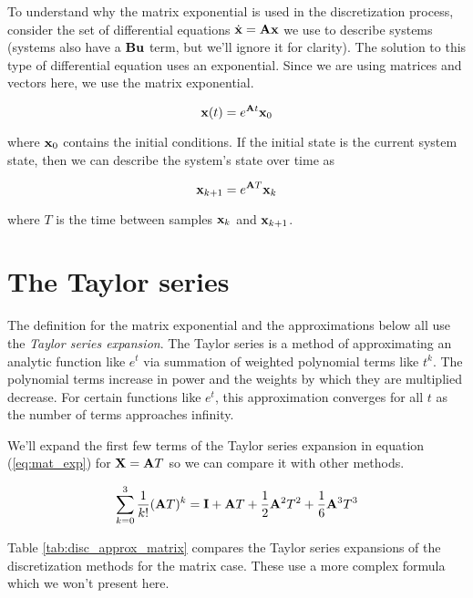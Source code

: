 To understand why the matrix exponential is used in the discretization process,
consider the set of differential equations $\dot{\mathbf{x}} = \mathbf{A}\mathbf{x}$ we
use to describe systems (systems also have a $\mathbf{B}\mathbf{u}$ term, but we'll
ignore it for clarity). The solution to this type of differential equation uses
an exponential. Since we are using matrices and vectors here, we use the matrix
exponential.

\begin{equation*}
  \mathbf{x}(t) = e^{\mathbf{A}t} \mathbf{x}_0
\end{equation*}

where $\mathbf{x}_0$ contains the initial conditions. If the initial state is the
current system state, then we can describe the system's state over time as

\begin{equation*}
  \mathbf{x}_{k+1} = e^{\mathbf{A}T} \mathbf{x}_k
\end{equation*}

where $T$ is the time between samples $\mathbf{x}_k$ and $\mathbf{x}_{k+1}$.

\section{The Taylor series}
The definition for the matrix exponential and the approximations below all use
the \textit{Taylor series expansion}. The Taylor series is a method of
approximating an analytic function like $e^t$ via summation of weighted
polynomial terms like $t^k$. The polynomial terms increase in power and the
weights by which they are multiplied decrease. For certain functions like $e^t$,
this approximation converges for all $t$ as the number of terms approaches
infinity.

We'll expand the first few terms of the Taylor series expansion in equation
(\ref{eq:mat_exp}) for $\mathbf{X} = \mathbf{A}T$ so we can compare it with other
methods.

\begin{equation*}
  \sum_{k=0}^3 \frac{1}{k!} (\mathbf{A}T)^k = \mathbf{I} + \mathbf{A}T +
    \frac{1}{2}\mathbf{A}^2T^2 + \frac{1}{6}\mathbf{A}^3T^3
\end{equation*}

Table \ref{tab:disc_approx_matrix} compares the Taylor series expansions of the
discretization methods for the matrix case. These use a more complex formula
which we won't present here.

